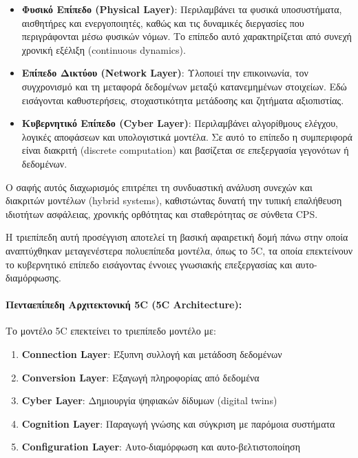 \begin{itemize}
	\item \textbf{Φυσικό Επίπεδο (Physical Layer)}: Περιλαμβάνει τα φυσικά
	      υποσυστήματα, αισθητήρες και ενεργοποιητές, καθώς και τις δυναμικές
	      διεργασίες που περιγράφονται μέσω φυσικών νόμων. Το επίπεδο αυτό
	      χαρακτηρίζεται από συνεχή χρονική εξέλιξη (continuous dynamics).

	\item \textbf{Επίπεδο Δικτύου (Network Layer)}: Υλοποιεί την επικοινωνία,
	      τον συγχρονισμό και τη μεταφορά δεδομένων μεταξύ κατανεμημένων
	      στοιχείων. Εδώ εισάγονται καθυστερήσεις, στοχαστικότητα μετάδοσης
	      και ζητήματα αξιοπιστίας.

	\item \textbf{Κυβερνητικό Επίπεδο (Cyber Layer)}: Περιλαμβάνει αλγορίθμους
	      ελέγχου, λογικές αποφάσεων και υπολογιστικά μοντέλα. Σε αυτό το
	      επίπεδο η συμπεριφορά είναι διακριτή (discrete computation) και
	      βασίζεται σε επεξεργασία γεγονότων ή δεδομένων.
\end{itemize}

Ο σαφής αυτός διαχωρισμός επιτρέπει τη συνδυαστική ανάλυση συνεχών και
διακριτών μοντέλων (hybrid systems), καθιστώντας δυνατή την τυπική επαλήθευση
ιδιοτήτων ασφάλειας, χρονικής ορθότητας και σταθερότητας σε σύνθετα CPS.

Η τριεπίπεδη αυτή προσέγγιση αποτελεί τη βασική αφαιρετική δομή πάνω στην οποία
αναπτύχθηκαν μεταγενέστερα πολυεπίπεδα μοντέλα, όπως το 5C, τα οποία
επεκτείνουν το κυβερνητικό επίπεδο εισάγοντας έννοιες γνωσιακής επεξεργασίας
και αυτο-διαμόρφωσης.

\paragraph{Πενταεπίπεδη Αρχιτεκτονική 5C (5C Architecture):}
Το μοντέλο 5C επεκτείνει το τριεπίπεδο μοντέλο με:
\begin{enumerate}
	\item \textbf{Connection Layer}: Έξυπνη συλλογή και μετάδοση δεδομένων
	\item \textbf{Conversion Layer}: Εξαγωγή πληροφορίας από δεδομένα
	\item \textbf{Cyber Layer}: Δημιουργία ψηφιακών δίδυμων (digital twins)
	\item \textbf{Cognition Layer}: Παραγωγή γνώσης και σύγκριση με παρόμοια
	      συστήματα
	\item \textbf{Configuration Layer}: Αυτο-διαμόρφωση και αυτο-βελτιστοποίηση
\end{enumerate}

